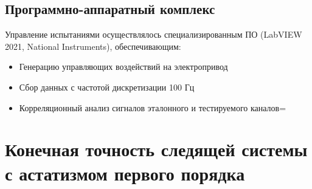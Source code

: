 \subsection{Программно-аппаратный комплекс}
Управление испытаниями осуществлялось специализированным ПО (LabVIEW 2021, National Instruments), обеспечивающим:
\begin{itemize}
    \item Генерацию управляющих воздействий на электропривод
    \item Сбор данных с частотой дискретизации 100 Гц
    \item Корреляционный анализ сигналов эталонного и тестируемого каналов=
\end{itemize}

\section{Конечная точность следящей системы с астатизмом первого порядка}


